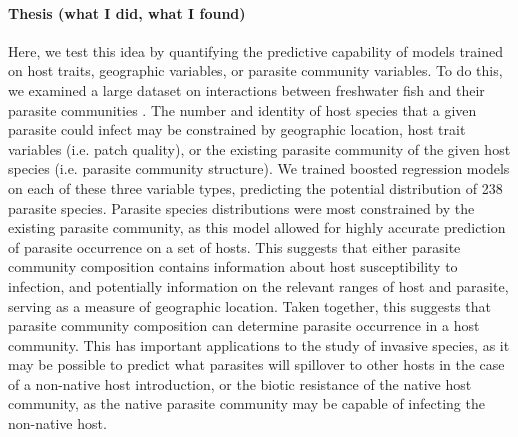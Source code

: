 \documentclass[12pt]{article}
\begin{document}
  
 \paragraph{Thesis (what I did, what I found)}
    
  Here, we test this idea by quantifying the predictive capability of models trained on host traits, geographic variables, or parasite community variables. To do this, we examined a large dataset on interactions between freshwater fish and their parasite communities \cite{strona2012}. The number and identity of host species that a given parasite could infect may be constrained by geographic location, host trait variables (i.e. patch quality), or the existing parasite community of the given host species (i.e. parasite community structure). We trained boosted regression models on each of these three variable types, predicting the potential distribution of 238 parasite species. Parasite species distributions were most constrained by the existing parasite community, as this model allowed for highly accurate prediction of parasite occurrence on a set of hosts. This suggests that either parasite community composition contains information about host susceptibility to infection, and potentially information on the relevant ranges of host and parasite, serving as a measure of geographic location. Taken together, this suggests that parasite community composition can determine parasite occurrence in a host community. This has important applications to the study of invasive species, as it may be possible to predict what parasites will spillover to other hosts in the case of a non-native host introduction, or the biotic resistance of the native host community, as the native parasite community may be capable of infecting the non-native host. 
  
  

\end{document}
